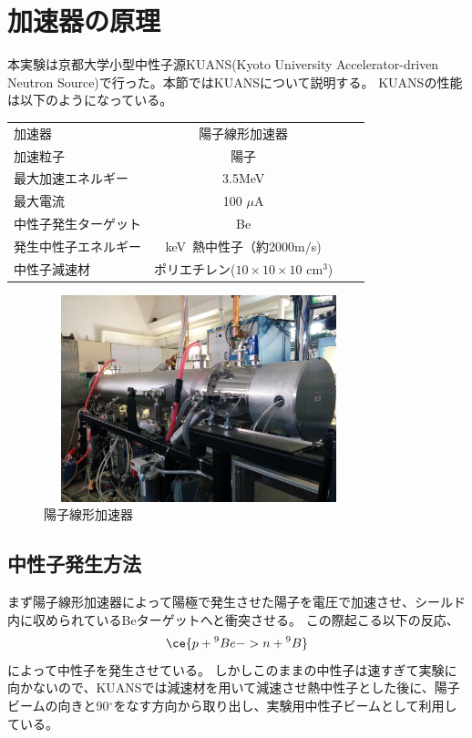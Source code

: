 \section{加速器の原理}
本実験は京都大学小型中性子源KUANS(Kyoto University Accelerator-driven Neutron Source)で行った。本節ではKUANSについて説明する。
KUANSの性能は以下のようになっている。


\begin{table}[htb]
\centering
\begin{tabular}{lcrr}
加速器&陽子線形加速器\\
加速粒子&陽子\\
最大加速エネルギー&3.5MeV\\
最大電流&100 $\mu$A \\
中性子発生ターゲット&Be\\
発生中性子エネルギー&keV~熱中性子（約2000m/s)\\
中性子減速材&ポリエチレン($10\times10\times10$ cm$^3$)\\
\end{tabular}
\end{table}

\begin{figure}[h]
\begin{center}
\includegraphics[width=9cm,height=6cm]{accelerator/accphoto.jpg}
\caption{陽子線形加速器}
\end{center}
\end{figure}

\subsection{中性子発生方法}
まず陽子線形加速器によって陽極で発生させた陽子を電圧で加速させ、シールド内に収められているBeターゲットへと衝突させる。
この際起こる以下の反応、\begin{equation}
\ce{p + {^{9}Be} ->n + {^{9}B}}\end{equation}
によって中性子を発生させている。
しかしこのままの中性子は速すぎて実験に向かないので、KUANSでは減速材を用いて減速させ熱中性子とした後に、陽子ビームの向きと90$^{\circ}$をなす方向から取り出し、実験用中性子ビームとして利用している。
